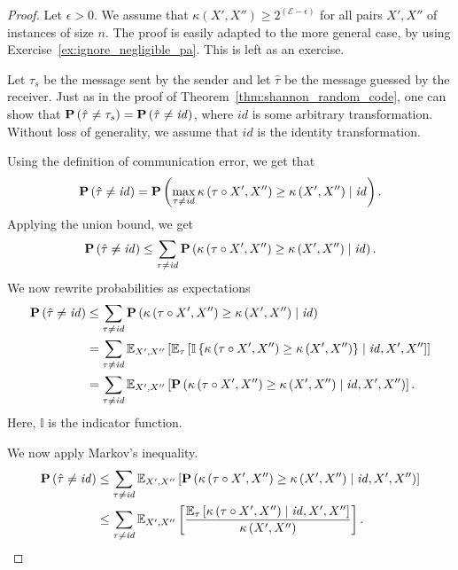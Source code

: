 \begin{proof}
Let $\epsilon > 0$. We assume that $\kappa\left(X', X''\right) \geq 2^{(\mathcal{E} - \epsilon)}$ for all pairs $X', X''$ of instances of size $n$. The proof is easily adapted to the more general case, by using Exercise~\ref{ex:ignore_negligible_pa}. This is left as an exercise.

Let $\tau_s$ be the message sent by the sender and let $\hat{\tau}$ be the message guessed by the receiver. Just as in the proof of Theorem~\ref{thm:shannon_random_code}, one can show that $\mathbf{P}\left(\hat{\tau} \neq \tau_s\right) = \mathbf{P}\left(\hat{\tau} \neq \mathit{id}\right)$, where $\mathit{id}$ is some arbitrary transformation. Without loss of generality, we assume that $\mathit{id}$ is the identity transformation.

Using the definition of communication error, we get that
%
$$\mathbf{P}\left(\hat{\tau} \neq \mathit{id}\right) = \mathbf{P}\left(\max_{\tau \neq \mathit{id}} \kappa\left(\tau\circ X', X''\right) \geq \kappa\left(X', X''\right) \mid \mathit{id}\right).$$
%
Applying the union bound, we get
%
$$\mathbf{P}\left(\hat{\tau} \neq \mathit{id}\right) \leq \sum_{\tau \neq \mathit{id}}\mathbf{P}\left(\kappa\left(\tau\circ X', X''\right) \geq \kappa\left(X', X''\right) \mid \mathit{id}\right).$$
%
We now rewrite probabilities as expectations
%
\begin{align*}
\mathbf{P}\left(\hat{\tau} \neq \mathit{id}\right) &\leq \sum_{\tau \neq \mathit{id}}\mathbf{P}\left(\kappa\left(\tau\circ X', X''\right) \geq \kappa\left(X', X''\right) \mid \mathit{id}\right)\\
&= \sum_{\tau \neq \mathit{id}}\mathbb{E}_{X', X''}\left[\mathbb{E}_{\tau}\left[\mathbb{I}\left\{\kappa\left(\tau\circ X', X''\right) \geq \kappa\left(X', X''\right)\right\} \mid \mathit{id}, X', X''\right]\right]\\
&= \sum_{\tau \neq \mathit{id}}\mathbb{E}_{X', X''}\left[\mathbf{P}\left(\kappa\left(\tau\circ X', X''\right) \geq \kappa\left(X', X''\right) \mid \mathit{id}, X', X''\right)\right].
\end{align*}
%
Here, $\mathbb{I}$ is the indicator function.

We now apply Markov's inequality.
%
\begin{align*}
\mathbf{P}\left(\hat{\tau} \neq \mathit{id}\right) &\leq \sum_{\tau \neq \mathit{id}}\mathbb{E}_{X', X''}\left[\mathbf{P}\left(\kappa\left(\tau\circ X', X''\right) \geq \kappa\left(X', X''\right) \mid \mathit{id}, X', X''\right)\right]\\
&\leq \sum_{\tau \neq \mathit{id}}\mathbb{E}_{X', X''}\left[\frac{\mathbb{E}_\tau\left[\kappa\left(\tau \circ X', X''\right) \mid \mathit{id}, X', X'' \right]}{\kappa\left(X', X''\right)}\right].
\end{align*}
%


\end{proof}
